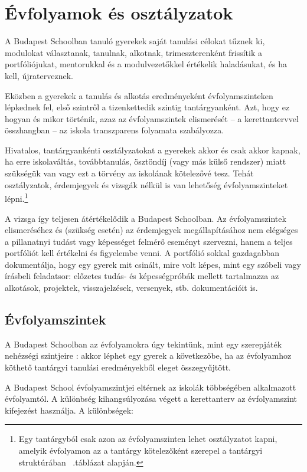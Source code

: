 \section{Évfolyamok és osztályzatok}
\label{sec:evfolyamok_osztalyzatok}
A Budapest Schoolban tanuló gyerekek saját tanulási célokat tűznek ki, modulokat választanak, tanulnak, alkotnak, trimeszterenként frissítik a portfóliójukat, mentorukkal és a modulvezetőkkel értékelik haladásukat, és ha kell, újraterveznek.

Eközben a gyerekek a tanulás és alkotás eredményeként évfolyamszinteken lépkednek fel, első szintről a tizenkettedik szintig tantárgyanként. Azt, hogy ez hogyan és mikor történik, azaz az évfolyamszintek elismerését -- a kerettantervvel összhangban -- az iskola transzparens folyamata szabályozza.

Hivatalos, tantárgyankénti osztályzatokat a gyerekek akkor és csak akkor kapnak, ha erre iskolaváltás, továbbtanulás, ösztöndíj (vagy más külső rendszer) miatt szükségük van vagy ezt a törvény az iskolának kötelezővé tesz. Tehát osztályzatok, érdemjegyek és vizsgák nélkül is van lehetőség évfolyamszinteket lépni.\footnote{Egy tantárgyból csak azon az évfolyamszinten lehet osztályzatot kapni, amelyik évfolyamon az a tantárgy kötelezőként szerepel a tantárgyi struktúrában ~.táblázat alapján.}

A vizsga így teljesen átértékelődik a Budapest Schoolban. Az évfolyamszintek elismeréséhez és (szükség esetén) az érdemjegyek megállapításához nem elégséges a pillanatnyi tudást vagy képességet felmérő eseményt szervezni, hanem a teljes portfóliót kell értékelni és figyelembe venni. A portfólió sokkal gazdagabban dokumentálja, hogy egy gyerek mit csinált, mire volt képes, mint egy szóbeli vagy írásbeli feladatsor: előzetes tudás- és képességpróbák mellett tartalmazza az alkotások, projektek, visszajelzések, versenyek, stb. dokumentációit is.

\subsection{Évfolyamszintek}
\label{sec:evfolyamok}

A Budapest Schoolban az évfolyamokra úgy tekintünk, mint egy szerepjáték nehézségi szintjeire \citep{wiki:game_levels}: akkor léphet egy gyerek a következőbe, ha az évfolyamhoz köthető tantárgyi tanulási eredményekből eleget összegyűjtött.

A Budapest School évfolyamszintjei eltérnek az iskolák többségében alkalmazott évfolyamtól. A különbség kihangsúlyozása végett a kerettanterv az évfolyamszint kifejezést használja. A különbségek:

